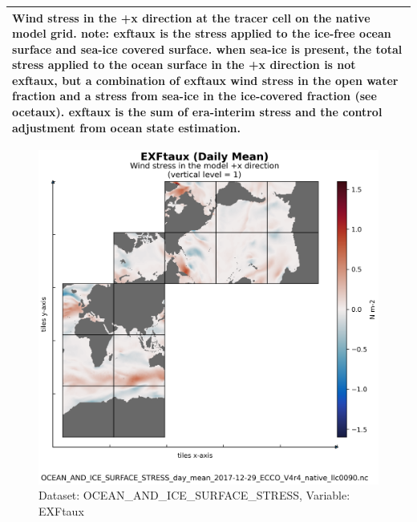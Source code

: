 \begin{longtable}{|m{}|m{}|m{}|m{}|}
\multicolumn{4}{|p{1\textwidth}|}{\footnotesize{{Wind stress in the +x direction at the tracer cell on the native model grid. note: exftaux is the stress applied to the ice-free ocean surface and sea-ice covered surface. when sea-ice is present, the total stress applied to the ocean surface in the +x direction is not exftaux, but a combination of exftaux wind stress in the open water fraction and a stress from sea-ice in the ice-covered fraction (see ocetaux). exftaux is the sum of era-interim stress and the control adjustment from ocean state estimation.}}} \\ \hline
\end{longtable}

\begin{figure}[H]
\centering
\includegraphics[scale=0.55]{../images/plots/native_plots/Ocean_and_Sea-Ice_Surface_Stress/EXFtaux.png}
\caption{Dataset: OCEAN\_AND\_ICE\_SURFACE\_STRESS, Variable: EXFtaux}
\label{tab:table-OCEAN_AND_ICE_SURFACE_STRESS_EXFtaux-Plot}
\end{figure}
\newpage
\pagebreak
